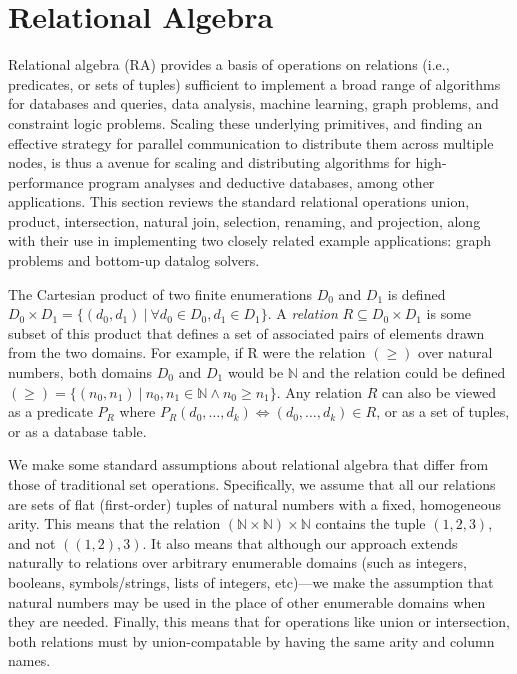 

\section{Relational Algebra}
\label{sec:ra}
%
Relational algebra (RA) provides a basis of operations on relations (i.e., predicates, or sets of tuples) sufficient to implement a broad range of algorithms for databases and queries, data analysis, machine learning, graph problems, and constraint logic problems. Scaling these underlying primitives, and finding an effective strategy for parallel communication to distribute them across multiple nodes, is thus a avenue for scaling and distributing algorithms for high-performance program analyses and deductive databases, among other applications. This section reviews the standard relational operations union, product, intersection, natural join, selection, renaming, and projection, along with their use in implementing two closely related example applications: graph problems and bottom-up datalog solvers.

The Cartesian product of two finite enumerations $D_0$ and $D_1$ is defined $D_0 \times D_1 = \{ (d_0, d_1) \ |\ \forall d_0 \in D_0, d_1 \in D_1 \}$. A \textit{relation} $R \subseteq D_0 \times D_1$ is some subset of this product that defines a set of associated pairs of elements drawn from the two domains. For example, if R were the relation $(\geq)$ over natural numbers, both domains $D_0$ and $D_1$ would be $\mathbb{N}$ and the relation could be defined $(\geq) = \{ (n_0, n_1) \ |\ n_0, n_1 \in \mathbb{N} \wedge n_0 \geq n_1 \}$. Any relation $R$ can also be viewed as a predicate $P_R$ where $P_R(d_0, \ldots, d_k) \iff (d_0, \ldots, d_k) \in R$, or as a set of tuples, or as a database table.

We make some standard assumptions about relational algebra that differ from those of traditional set operations. Specifically, we assume that all our relations are sets of flat (first-order) tuples of natural numbers with a fixed, homogeneous arity. This means that the relation $(\mathbb{N} \times \mathbb{N}) \times \mathbb{N}$ contains the tuple $(1,2,3)$, and not $((1,2),3)$. It also means that although our approach extends naturally to relations over arbitrary enumerable domains (such as integers, booleans, symbols/strings, lists of integers, etc)---we make the assumption that natural numbers may be used in the place of other enumerable domains when they are needed. Finally, this means that for operations like union or intersection, both relations must by union-compatable by having the same arity and column names.    


